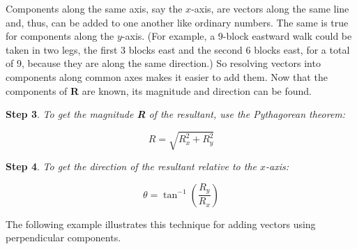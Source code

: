 \documentclass[main-ap-physics.tex]{subfiles}
\begin{document}
Components along the same axis, say the $x$-axis, are vectors along the same line and, thus, can be added to one another like ordinary numbers. The same is true for components along the $y$-axis. (For example, a 9-block eastward walk could be taken in two legs, the first 3 blocks east and the second 6 blocks east, for a total of 9, because they are along the same direction.) So resolving vectors into components along common axes makes it easier to add them. Now that the components of \textbf{R} are known, its magnitude and direction can be found.

\vspace{1em}

\textbf{Step 3}. \textit{To get the magnitude \textbf{R} of the resultant, use the Pythagorean theorem:}

\begin{equation}
    R = \sqrt{R_x^2 + R_y^2}
\end{equation}

\textbf{Step 4}. \textit{To get the direction of the resultant relative to the $x$-axis:}

\begin{equation}
    \theta = \tan^{-1}\left(\frac{R_y}{R_x}\right)
\end{equation}

The following example illustrates this technique for adding vectors using perpendicular components.
\end{document}

